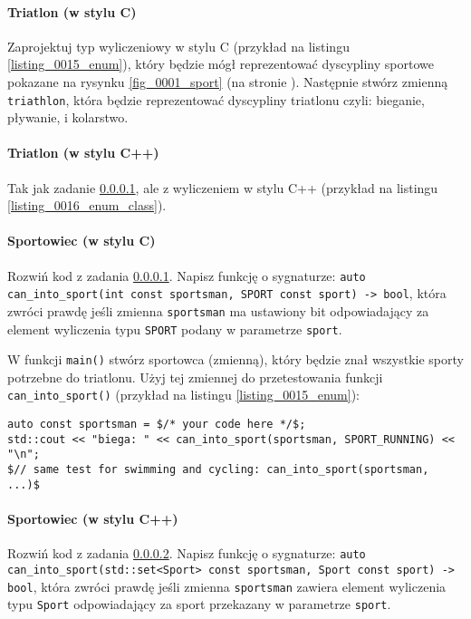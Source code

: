 \documentclass[11pt,a4paper,titlepage,onecolumn]{article}
\begin{document}
\paragraph{Triatlon (w stylu C)}\label{ex_0000_c_style_triathlon} Zaprojektuj
typ wyliczeniowy w stylu C (przykład na listingu \ref{listing_0015_enum}), który
będzie mógł reprezentować dyscypliny sportowe pokazane na rysynku
\ref{fig_0001_sport} (na stronie \pageref{fig_0001_sport}). Następnie stwórz
zmienną \texttt{triathlon}, która będzie reprezentować dyscypliny triatlonu
czyli: bieganie, pływanie, i kolarstwo.

\paragraph{Triatlon (w stylu C++)}\label{ex_0000_cxx_style_triathlon} Tak jak
zadanie \ref{ex_0000_c_style_triathlon}, ale z wyliczeniem w stylu C++ (przykład
na listingu \ref{listing_0016_enum_class}).

\paragraph{Sportowiec (w stylu C)}\label{ex_0000_c_style_sportsman} Rozwiń kod z
zadania \ref{ex_0000_c_style_triathlon}. Napisz funkcję o sygnaturze:
\texttt{auto can\_into\_sport(int const sportsman, SPORT const sport) -> bool},
która zwróci prawdę jeśli zmienna \texttt{sportsman} ma ustawiony bit
odpowiadający za element wyliczenia typu \texttt{SPORT} podany w parametrze
\texttt{sport}.

W funkcji \texttt{main()} stwórz sportowca (zmienną), który będzie znał
wszystkie sporty potrzebne do triatlonu. Użyj tej zmiennej do przetestowania
funkcji \texttt{can\_into\_sport()} (przykład na listingu
\ref{listing_0015_enum}):
{\small
\begin{lstlisting}
auto const sportsman = $/* your code here */$;
std::cout << "biega: " << can_into_sport(sportsman, SPORT_RUNNING) << "\n";
$// same test for swimming and cycling: can_into_sport(sportsman, ...)$
\end{lstlisting}}

\paragraph{Sportowiec (w stylu C++)}\label{ex_0000_cxx_style_sportsman} Rozwiń kod z
zadania \ref{ex_0000_cxx_style_triathlon}. Napisz funkcję o sygnaturze:
\texttt{auto can\_into\_sport(std::set<Sport> const sportsman, Sport const sport) -> bool},
która zwróci prawdę jeśli zmienna \texttt{sportsman} zawiera element wyliczenia
typu \texttt{Sport} odpowiadający za sport przekazany w parametrze
\texttt{sport}.
\end{document}
